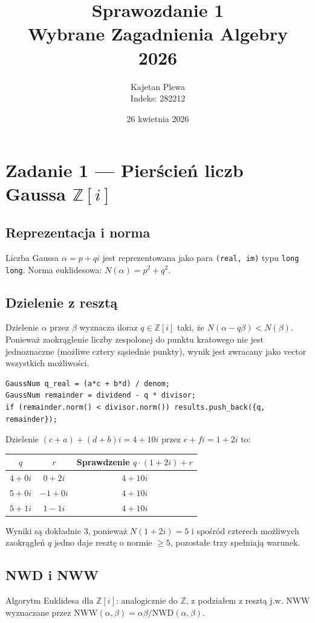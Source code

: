 \documentclass[a4paper,11pt]{article}
\title{\textbf{Sprawozdanie 1}\\Wybrane Zagadnienia Algebry 2026}
\author{Kajetan Plewa \\ Indeks: 282212}
\date{26 kwietnia 2026}
\begin{document}
\maketitle
\noindent

\section*{Zadanie 1 --- Pierścień liczb Gaussa $\mathbb{Z}[i]$}

\subsection*{Reprezentacja i norma}
Liczba Gaussa $\alpha = p + qi$ jest reprezentowana jako para \texttt{(real, im)} typu \texttt{long long}.
Norma euklidesowa: $N(\alpha) = p^2 + q^2$.

\subsection*{Dzielenie z resztą}
Dzielenie $\alpha$ przez $\beta$ wyznacza iloraz $q \in \mathbb{Z}[i]$ taki, że $N(\alpha - q\beta) < N(\beta)$.
Ponieważ zaokrąglenie liczby zespolonej do punktu kratowego nie jest jednoznaczne (możliwe cztery sąsiednie punkty), wynik jest zwracany jako vector wszystkich możliwości.

\begin{lstlisting}
GaussNum q_real = (a*c + b*d) / denom; 
GaussNum remainder = dividend - q * divisor;
if (remainder.norm() < divisor.norm()) results.push_back({q, remainder});
\end{lstlisting}

Dzielenie $(c+a) + (d+b)i = 4+10i$ przez $e+fi = 1+2i$ to:

\begin{center}
\begin{tabular}{ccc}
\toprule
$q$ & $r$ & Sprawdzenie $q \cdot (1+2i) + r$\\
\midrule
$4+0i$ & $0+2i$ & $4+10i$ \\
$5+0i$ & $-1+0i$ & $4+10i$ \\
$5+1i$ & $1-1i$ & $4+10i$ \\
\bottomrule
\end{tabular}
\end{center}

Wyniki są dokładnie 3, ponieważ $N(1+2i)=5$ i spośród czterech możliwych zaokrągleń $q$ jedno daje resztę o normie $\geq 5$, pozostałe trzy spełniają warunek.

\subsection*{NWD i NWW}
Algorytm Euklidesa dla $\mathbb{Z}[i]$: analogicznie do $\mathbb{Z}$, z podziałem z resztą j.w.
NWW wyznaczane przez $\text{NWW}(\alpha,\beta) = \alpha\beta / \text{NWD}(\alpha,\beta)$.
\end{document}

